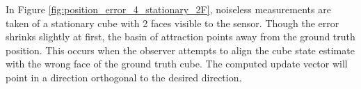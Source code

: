 In Figure \ref{fig:position_error_4_stationary_2F}, noiseless measurements are taken of a stationary cube with 2 faces visible to the sensor. Though the error shrinks slightly at first, the basin of attraction points away from the ground truth position. 
This occurs when the observer attempts to align the cube state estimate with the wrong face of the ground truth cube. The computed update vector will point in a direction orthogonal to the desired direction.

\begin{figure}
\centering
\end{figure}
